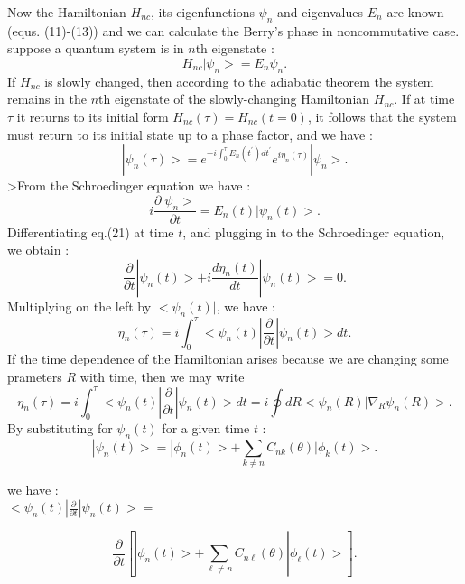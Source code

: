 \documentclass[a4paper,a4paper]{article}
\begin{document}
Now the Hamiltonian $H_{nc}$, its eigenfunctions $\psi_{n}$ and
eigenvalues $E_{n}$ are known (equs. (11)-(13)) and we can
calculate the Berry's phase in noncommutative case. suppose a
quantum system is in $n$th eigenstate :
\begin{equation}
H_{nc}|\psi_{n}>=E_{n}\psi_{n} .
\end{equation}
If $H_{nc}$ is slowly changed, then according to the adiabatic
theorem the system remains in the $n$th eigenstate of the
slowly-changing Hamiltonian $H_{nc}$. If at time $\tau$ it returns
to its initial form $H_{nc}(\tau)=H_{nc}(t=0)$, it follows that
the system must return to its initial state up to a phase factor,
and we have :
\begin{equation}
|\psi_{n}(\tau)>=e^{-i\int_{0}^{\tau}E_{n}(t^{\prime})d
t^{\prime}}e^{i\eta_{n}(\tau)}|\psi_{n}> .
\end{equation}
>From the Schroedinger equation we have :
\begin{equation}
i\frac{\partial |\psi_{n}>}{\partial t}=E_{n}(t)|\psi_{n}(t)>.
\end{equation}
Differentiating eq.(21) at time $t$, and plugging in to the
Schroedinger equation, we obtain :
\begin{equation}
\frac{\partial}{\partial t}|\psi_{n}(t)>+i\frac{d\eta_{n}(t)}{d
t}|\psi_{n}(t)>=0.
\end{equation}
Multiplying on the left by $<\psi_{n}(t)|$, we have :
\begin{equation}
\eta_{n}(\tau)=i\int_{0}^{\tau}<\psi_{n}(t)|\frac{\partial}{\partial
t }|\psi_{n}(t)> d t  .
\end{equation}
If the time dependence of the Hamiltonian arises because we are
changing some prameters $R$ with time, then we may write
\begin{equation}
\eta_{n}(\tau)=i\int_{0}^{\tau}<\psi_{n}(t)|\frac{\partial}{\partial
t }|\psi_{n}(t)> d t=i\oint dR
<\psi_{n}(R)|\nabla_{R}\psi_{n}(R)> .
\end{equation}
By substituting for $\psi_{n}(t)$ for a given time $t$ :
\begin{equation}
|\psi_{n}(t)>=|\phi_{n}(t)>+\sum_{k\neq n} C_{nk}(\theta)
|\phi_{k}(t)> .
\end{equation}

we have : \\

$<\psi_{n}(t)|\frac{\partial}{\partial
t}|\psi_{n}(t)>=$

\begin{equation}
[<\phi_{n}(t)|+\sum_{k\neq n} C_{nk}(\theta)
<\phi_{k}(t)|]\frac{\partial}{\partial t}[|\phi_{n}(t)>+ \sum_{\ell\neq n}
C_{n\ell}(\theta)
|\phi_{\ell}(t)>] .
\end{equation}
\end{document}
